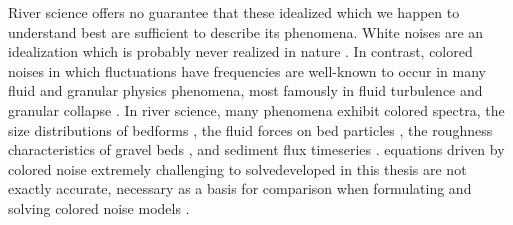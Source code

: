 River science offers no guarantee that these idealized \DIFdelbegin {}\DIFdelend \DIFaddbegin {}\DIFaddend which we happen to understand best are sufficient to describe its phenomena.
White noises \DIFaddbegin {}\DIFaddend are an idealization which is probably never realized in nature \citep{Gardiner1983,Kubo1978}.
In contrast, colored noises in which fluctuations have \DIFdelbegin {}\DIFdelend \DIFaddbegin {}\DIFaddend frequencies are well-known to occur in many fluid and granular physics phenomena, most famously in \DIFdelbegin {}\DIFdelend fluid turbulence \citep{Kolmogorov1941,Nikora2000} and granular collapse \citep{Bak1987,Jensen1998}.
In river science, many phenomena exhibit colored spectra, \DIFdelbegin {}\DIFdelend \DIFaddbegin {}\DIFaddend the size distributions of bedforms \citep{Nikora1997,Guala2014}, the fluid forces on bed particles \citep{Dwivedi2011, Amir2014}, the roughness characteristics of gravel beds \citep{Aberle2006,Singh2012}, and sediment flux timeseries \citep{Dhont2018,Chartrand2021}.
\DIFdelbegin {}\DIFdelend \DIFaddbegin {}\DIFaddend equations driven by colored noise \DIFdelbegin {}\DIFdelend \DIFaddbegin {}\DIFaddend extremely challenging to solve\DIFdelbegin {}\DIFdelend \DIFaddbegin {}\DIFaddend developed in this thesis are not exactly accurate, \DIFdelbegin {}\DIFdelend \DIFaddbegin {}\DIFaddend necessary as a basis for comparison when formulating and solving \DIFaddbegin {}\DIFaddend colored noise models \DIFdelbegin {}\DIFdelend \DIFaddbegin {}\DIFaddend .

